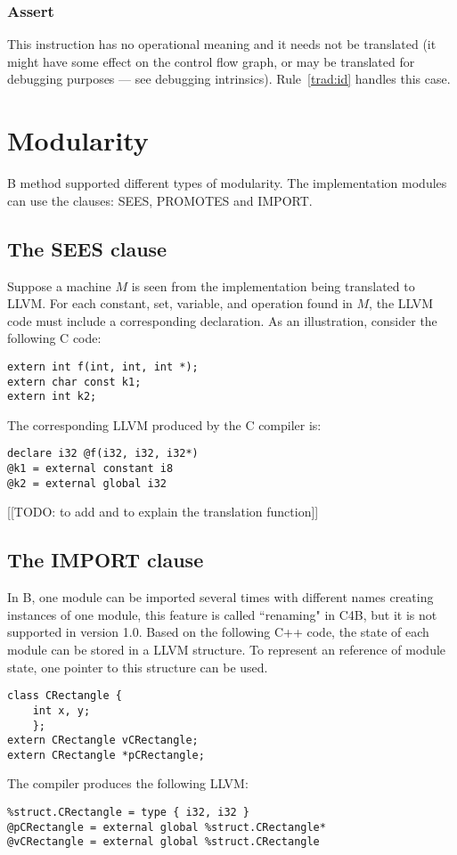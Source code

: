 \documentclass{article}
\begin{document}

\subsubsection{Assert}

This instruction has no operational meaning and it needs not be
translated (it might have some effect on the control flow graph, or
may be translated for debugging purposes --- see debugging
intrinsics). Rule~\ref{trad:id} handles this case.

\section{Modularity}


B method supported different types of modularity.
The implementation modules can use the clauses: SEES, PROMOTES and IMPORT.



\subsection{The SEES clause}

Suppose a machine $M$ is seen from the implementation being translated
to LLVM. For each constant, set, variable, and operation found in $M$,
the LLVM code must include a corresponding declaration. As an
illustration, consider the following C code:
\begin{verbatim}
extern int f(int, int, int *);
extern char const k1;
extern int k2;
\end{verbatim}
The corresponding LLVM produced by the C compiler is:
\begin{verbatim}
declare i32 @f(i32, i32, i32*)
@k1 = external constant i8
@k2 = external global i32
\end{verbatim}

[[TODO: to add and to explain the translation function]]

\subsection{The IMPORT clause}

In B, one module can be imported several times with different
names creating instances of one module, this feature is called 
``renaming" in C4B, but it is not supported in version 1.0. Based on
the following C++ code, the state of each module can be stored in a LLVM
structure. To represent an reference of module state, one pointer to this
structure can be used. 
\begin{verbatim}
class CRectangle {
    int x, y;  
    };
extern CRectangle vCRectangle;
extern CRectangle *pCRectangle;
\end{verbatim}
The compiler produces the following LLVM:
\begin{verbatim}
%struct.CRectangle = type { i32, i32 }
@pCRectangle = external global %struct.CRectangle* 
@vCRectangle = external global %struct.CRectangle 
\end{verbatim}
\end{document}
